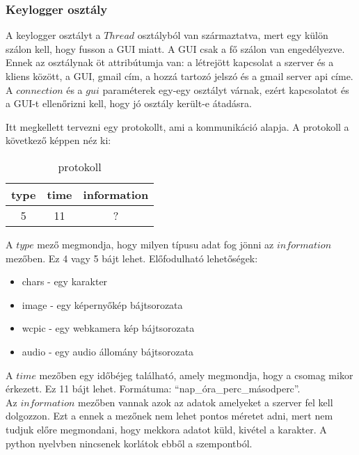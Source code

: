 \documentclass[a4paper, 11pt]{article}
\begin{document}
\subsubsection{Keylogger osztály}\label{subsubsec:keyloggerclass}
A keylogger osztályt a $Thread$ osztályból van származtatva, mert egy külön szálon kell, hogy fusson a GUI miatt. A GUI csak a fő szálon van engedélyezve. Ennek az osztálynak öt attribútumja van: a létrejött kapcsolat a szerver és a kliens között, a GUI, gmail cím, a hozzá tartozó jelszó és a gmail server api címe. A $connection$ és a $gui$ paraméterek egy-egy osztályt várnak, ezért kapcsolatot és a GUI-t ellenőrizni kell, hogy jó osztály került-e átadásra.


Itt megkellett tervezni egy protokollt, ami a kommunikáció alapja. A protokoll a következő képpen néz ki:
\begin{table}[H]
\centering
\label{tab:protocol}
\caption{protokoll}
\begin{tabular}{|c|c|c|}
\hline
\textbf{type} & \textbf{time} & \textbf{information} \\
\hline
5 & 11 & ? \\
\hline
\end{tabular}
\end{table}
A $type$ mező megmondja, hogy milyen típusu adat fog jönni az $information$ mezőben. Ez 4 vagy 5 bájt lehet. Előfodulható lehetőségek:
\begin{itemize}
\item chars - egy karakter
\item image - egy képernyőkép bájtsorozata
\item wcpic - egy webkamera kép bájtsorozata
\item audio - egy audio állomány bájtsorozata
\end{itemize}
A $time$ mezőben egy időbéjeg található, amely megmondja, hogy a csomag mikor érkezett. Ez 11 bájt lehet. Formátuma: ``nap\_óra\_perc\_másodperc''.\\
Az $information$ mezőben vannak azok az adatok amelyeket a szerver fel kell dolgozzon. Ezt a ennek a mezőnek nem lehet pontos méretet adni, mert nem tudjuk előre megmondani, hogy mekkora adatot küld, kivétel a karakter. A python nyelvben nincsenek korlátok ebből a szempontból.
\end{document}
